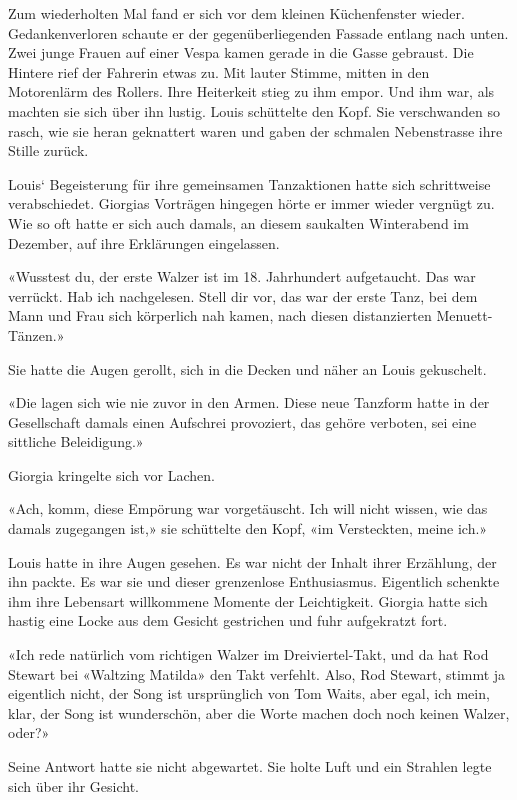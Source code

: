 Zum wiederholten Mal fand er sich vor dem kleinen Küchenfenster wieder. Gedankenverloren schaute er der gegenüberliegenden Fassade entlang nach unten. Zwei junge Frauen auf einer Vespa kamen gerade in die Gasse gebraust. Die Hintere rief der Fahrerin etwas zu. Mit lauter Stimme, mitten in den Motorenlärm des Rollers. Ihre Heiterkeit stieg zu ihm empor. Und ihm war, als machten sie sich über ihn lustig. Louis schüttelte den Kopf. Sie verschwanden so rasch, wie sie heran geknattert waren und gaben der schmalen Nebenstrasse ihre Stille zurück.

\sectionbreak

Louis` Begeisterung für ihre gemeinsamen Tanzaktionen hatte sich schrittweise verabschiedet. Giorgias Vorträgen hingegen hörte er immer wieder vergnügt zu. Wie so oft hatte er sich auch damals, an diesem saukalten Winterabend im Dezember, auf ihre Erklärungen eingelassen.

«Wusstest du, der erste Walzer ist im 18. Jahrhundert aufgetaucht. Das war verrückt. Hab ich nachgelesen. Stell dir vor, das war der erste Tanz, bei dem Mann und Frau sich körperlich nah kamen, nach diesen distanzierten Menuett-Tänzen.»

Sie hatte die Augen gerollt, sich in die Decken und näher an Louis gekuschelt.

«Die lagen sich wie nie zuvor in den Armen. Diese neue Tanzform hatte in der Gesellschaft damals einen Aufschrei provoziert, das gehöre verboten, sei eine sittliche Beleidigung.»

Giorgia kringelte sich vor Lachen.

«Ach, komm, diese Empörung war vorgetäuscht. Ich will nicht wissen, wie das damals zugegangen ist,» sie schüttelte den Kopf, «im Versteckten, meine ich.»

Louis hatte in ihre Augen gesehen. Es war nicht der Inhalt ihrer Erzählung, der ihn packte. Es war sie und dieser grenzenlose Enthusiasmus. Eigentlich schenkte ihm ihre Lebensart willkommene Momente der Leichtigkeit. Giorgia hatte sich hastig eine Locke aus dem Gesicht gestrichen und fuhr aufgekratzt fort.

«Ich rede natürlich vom richtigen Walzer im Dreiviertel-Takt, und da hat Rod Stewart bei «Waltzing Matilda» den Takt verfehlt. Also, Rod Stewart, stimmt ja eigentlich nicht, der Song ist ursprünglich von Tom Waits, aber egal, ich mein, klar, der Song ist wunderschön, aber die Worte machen doch noch keinen Walzer, oder?»

Seine Antwort hatte sie nicht abgewartet. Sie holte Luft und ein Strahlen legte sich über ihr Gesicht.

